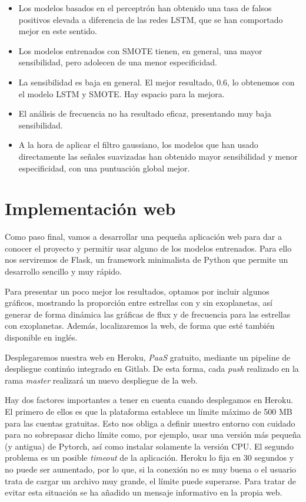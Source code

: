 \begin{itemize}
    \item Los modelos basados en el perceptrón han obtenido una tasa de falsos positivos elevada a diferencia de las redes LSTM, que se han comportado mejor en este sentido.
    \item Los modelos entrenados con SMOTE tienen, en general, una mayor sensibilidad, pero adolecen de una menor especificidad.
    \item La sensibilidad es baja en general. El mejor resultado, 0.6, lo obtenemos con el modelo LSTM y SMOTE. Hay espacio para la mejora.
    \item El análisis de frecuencia no ha resultado eficaz, presentando muy baja sensibilidad.
    \item A la hora de aplicar el filtro gaussiano, los modelos que han usado directamente las señales suavizadas han obtenido mayor sensibilidad y menor especificidad, con una puntuación global mejor.
\end{itemize}

\section{Implementación web}

Como paso final, vamos a desarrollar una pequeña aplicación web para dar a conocer el proyecto y permitir usar alguno de los modelos entrenados. Para ello nos serviremos de Flask, un framework minimalista de Python que permite un desarrollo sencillo y muy rápido.

Para presentar un poco mejor los resultados, optamos por incluir algunos gráficos, mostrando la proporción entre estrellas con y sin exoplanetas, así generar de forma dinámica las gráficas de flux y de frecuencia para las estrellas con exoplanetas. Además, localizaremos la web, de forma que esté también disponible en inglés.

Desplegaremos nuestra web en Heroku, \textit{PaaS} gratuito, mediante un pipeline de despliegue continúo integrado en Gitlab. De esta forma, cada \textit{push} realizado en la rama \textit{master} realizará un nuevo despliegue de la web. 

Hay dos factores importantes a tener en cuenta cuando desplegamos en Heroku. El primero de ellos es que la plataforma establece un límite máximo de 500 MB para las cuentas gratuitas. Esto nos obliga a definir nuestro entorno con cuidado para no sobrepasar dicho límite como, por ejemplo, usar una versión más pequeña (y antigua) de Pytorch, así como instalar solamente la versión CPU. El segundo problema es un posible \textit{timeout} de la aplicación. Heroku lo fija en 30 segundos y no puede ser aumentado, por lo que, si la conexión no es muy buena o el usuario trata de cargar un archivo muy grande, el límite puede superarse. Para tratar de evitar esta situación se ha añadido un mensaje informativo en la propia web.
